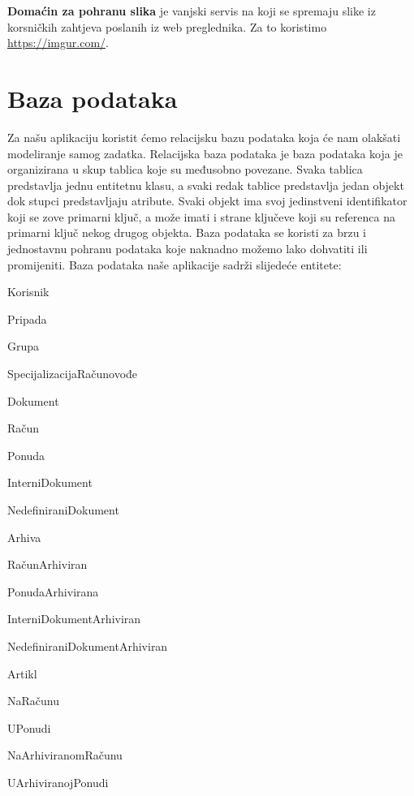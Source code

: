 		\textbf{Domaćin za pohranu slika} je vanjski servis na koji se spremaju slike iz korsničkih zahtjeva poslanih iz web preglednika. Za to koristimo \url{https://imgur.com/}.


				
		\section{Baza podataka}

		Za našu aplikaciju koristit ćemo relacijsku bazu podataka koja će nam olakšati modeliranje samog zadatka. 
		Relacijska baza podataka je baza podataka koja je organizirana u skup tablica koje su međusobno povezane. 
		Svaka tablica predstavlja jednu entitetnu klasu, a svaki redak tablice predstavlja jedan objekt dok stupci predstavljaju atribute. 
		Svaki objekt ima svoj jedinstveni identifikator koji se zove primarni ključ, a može imati i strane ključeve koji su referenca na primarni ključ nekog drugog objekta.
		Baza podataka se koristi za brzu i jednostavnu pohranu podataka koje naknadno možemo lako dohvatiti ili promijeniti.
		Baza podataka naše aplikacije sadrži slijedeće entitete: 

		\begin{packed_item}
			\item  Korisnik
			\item  Pripada
			\item  Grupa
			\item  SpecijalizacijaRačunovođe
			\item  Dokument
			\item  Račun
			\item  Ponuda
			\item  InterniDokument
			\item  NedefiniraniDokument
			\item  Arhiva
			\item  RačunArhiviran
			\item  PonudaArhivirana
			\item  InterniDokumentArhiviran
			\item  NedefiniraniDokumentArhiviran
			\item  Artikl
			\item  NaRačunu
			\item  UPonudi
			\item  NaArhiviranomRačunu
			\item  UArhiviranojPonudi
		\end{packed_item}
		
